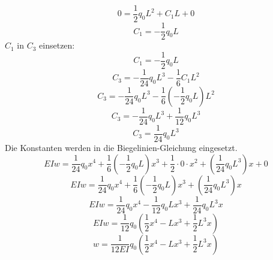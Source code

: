 \begin{equation}
	0=
	\frac{1}{2}q_0L^2+C_1L+0
\end{equation}
\begin{equation}
	C_1=
	-\frac{1}{2}q_0L
\end{equation}
$C_1$ in $C_3$ einsetzen:
\begin{equation}
	C_1=
	-\frac{1}{2}q_0L
\end{equation}
\begin{equation}
	C_3=
	-\frac{1}{24}q_0L^3-\frac{1}{6}C_1L^2
\end{equation}
\begin{equation}
	C_3=
	-\frac{1}{24}q_0L^3-\frac{1}{6}\left(-\frac{1}{2}q_0L\right)L^2
\end{equation}
\begin{equation}
	C_3=
	-\frac{1}{24}q_0L^3+\frac{1}{12}q_0L^3
\end{equation}
\begin{equation}
	C_3=
	\frac{1}{24}q_0L^3
\end{equation}
Die Konstanten werden in die Biegelinien-Gleichung eingesetzt.
\begin{equation}
	EIw=
	\frac{1}{24}q_0x^4+\frac{1}{6}\left(-\frac{1}{2}q_0L\right)x^3+\frac{1}{2}\cdot0\cdot x^2+\left(\frac{1}{24}q_0L^3\right)x+0
\end{equation}
\begin{equation}
	EIw=
	\frac{1}{24}q_0x^4+\frac{1}{6}\left(-\frac{1}{2}q_0L\right)x^3+\left(\frac{1}{24}q_0L^3\right)x
\end{equation}
\begin{equation}
	EIw=
	\frac{1}{24}q_0x^4-\frac{1}{12}q_0Lx^3+\frac{1}{24}q_0L^3x
\end{equation}
\begin{equation}
	EIw=
	\frac{1}{12}q_0\left(\frac{1}{2}x^4-Lx^3+\frac{1}{2}L^3x\right)
\end{equation}
\begin{equation}
	w=
	\frac{1}{12EI}q_0\left(\frac{1}{2}x^4-Lx^3+\frac{1}{2}L^3x\right)
\end{equation}

